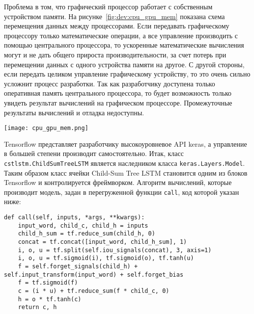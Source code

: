 Проблема в том, что графический процессор работает с собственным устройством памяти. На рисунке~\ref{fig:dev:cpu_gpu_mem} показана схема перемещения данных между процессорами. Если передавать графическому процессору только математические операции, а все управление производить с помощью центрального процессора, то ускоренные математические вычисления могут и не дать общего прироста производительности, за счет потерь при перемещении данных с одного устройства памяти на другое. С другой стороны, если передать целиком управление графическому устройству, то это очень сильно усложнит процесс разработки. Так как разработчику доступена только оперативная память центрального процессора, то будет возможность только увидеть результат вычислений на графическом процессоре. Промежуточные результаты вычислений и отладка недоступны.

\begin{center}
  \texttt{[image: cpu\_gpu\_mem.png]}
  \label{fig:dev:cpu_gpu_mem}
\end{center}

Tensorflow представляет разработчику высокоуровневое API keras, а управление в большей степени производит самостоятельно. Итак, класс \texttt{cstlstm.ChildSumTreeLSTM} является наследником класса \texttt{keras.Layers.Model}. Таким образом класс ячейки Child-Sum Tree LSTM становится одним из блоков Tensorflow и контролируется фреймворком. Алгоритм вычислений, которые производит модель, задан в перегруженной функции \texttt{call}, код которой указан ниже:
\medskip
\begin{lstlisting}[style=Python]
  def call(self, inputs, *args, **kwargs):
    input_word, child_c, child_h = inputs
    child_h_sum = tf.reduce_sum(child_h, 0)
    concat = tf.concat([input_word, child_h_sum], 1)
    i, o, u = tf.split(self.iou_signals(concat), 3, axis=1)
    i, o, u = tf.sigmoid(i), tf.sigmoid(o), tf.tanh(u)
    f = self.forget_signals(child_h) + self.input_transform(input_word) + self.forget_bias
    f = tf.sigmoid(f)
    c = (i * u) + tf.reduce_sum(f * child_c, 0)
    h = o * tf.tanh(c)
    return c, h
\end{lstlisting}
\medskip

